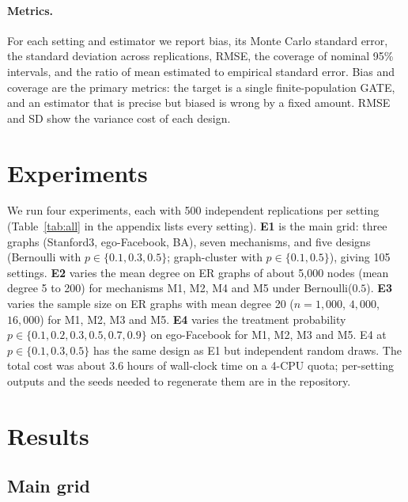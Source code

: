 \documentclass{article}
\begin{document}
\paragraph{Metrics.} For each setting and estimator we report bias, its Monte Carlo standard error, the standard deviation across replications, RMSE, the coverage of nominal 95\% intervals, and the ratio of mean estimated to empirical standard error. Bias and coverage are the primary metrics: the target is a single finite-population GATE, and an estimator that is precise but biased is wrong by a fixed amount. RMSE and SD show the variance cost of each design.

\section{Experiments}
\label{sec:experiments}
We run four experiments, each with 500 independent replications per setting (Table~\ref{tab:all} in the appendix lists every setting). \textbf{E1} is the main grid: three graphs (Stanford3, ego-Facebook, BA), seven mechanisms, and five designs (Bernoulli with $p\in\{0.1,0.3,0.5\}$; graph-cluster with $p\in\{0.1,0.5\}$), giving 105 settings. \textbf{E2} varies the mean degree on ER graphs of about 5{,}000 nodes (mean degree 5 to 200) for mechanisms M1, M2, M4 and M5 under Bernoulli($0.5$). \textbf{E3} varies the sample size on ER graphs with mean degree 20 ($n=1{,}000$, $4{,}000$, $16{,}000$) for M1, M2, M3 and M5. \textbf{E4} varies the treatment probability $p\in\{0.1,0.2,0.3,0.5,0.7,0.9\}$ on ego-Facebook for M1, M2, M3 and M5. E4 at $p\in\{0.1,0.3,0.5\}$ has the same design as E1 but independent random draws. The total cost was about 3.6 hours of wall-clock time on a 4-CPU quota; per-setting outputs and the seeds needed to regenerate them are in the repository.

\section{Results}
\label{sec:results}
\subsection{Main grid}
\label{sec:main}

\begin{table}[t]
\caption{Stanford3, Bernoulli($p=0.5$), 500 replications. DiM and OLS biases are relative to the GATE. Coverage is for nominal 95\% intervals. The quadratic OLS and gradient boosting (GBM) are shown for comparison.}
\label{tab:main}
\centering
\small

\end{table}
\end{document}
